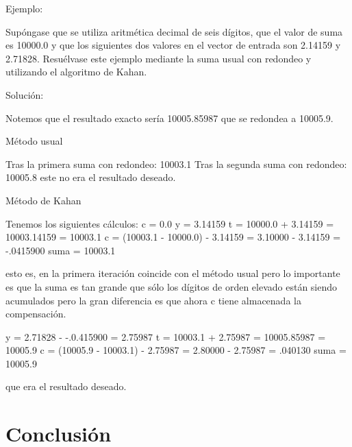 \documentclass{article}
\theoremstyle{theorem-style}  %
\theoremstyle{definition-style}
\theoremstyle{example-style}
\begin{document}
Ejemplo:

Supóngase que se utiliza aritmética decimal de seis dígitos, que el valor de suma es 10000.0 y que los siguientes dos valores en el vector de entrada son 2.14159 y 2.71828. Resuélvase este ejemplo mediante la suma usual con redondeo y utilizando el algoritmo de Kahan. 

Solución:

Notemos que el resultado exacto sería 10005.85987 que se redondea a 10005.9.

Método usual

Tras la primera suma con redondeo: 10003.1
Tras la segunda suma con redondeo: 10005.8
este no era el resultado deseado.

Método de Kahan

Tenemos los siguientes cálculos:
c = 0.0
y = 3.14159 
t = 10000.0 + 3.14159 = 10003.14159 = 10003.1
c = (10003.1 - 10000.0) - 3.14159 = 3.10000 - 3.14159 = -.0415900
suma = 10003.1

esto es, en la primera iteración coincide con el método usual pero lo importante es que la suma es tan grande que sólo los dígitos de orden elevado están siendo acumulados pero la gran diferencia es que ahora c tiene almacenada la compensación.

y = 2.71828 - -.0.415900 = 2.75987
t = 10003.1 + 2.75987 = 10005.85987 = 10005.9
c = (10005.9 - 10003.1) - 2.75987 = 2.80000 - 2.75987 = .040130
suma = 10005.9

que era el resultado deseado.


\section{Conclusión} \label{sec:conclusion}



\printbibliography
\end{document}
